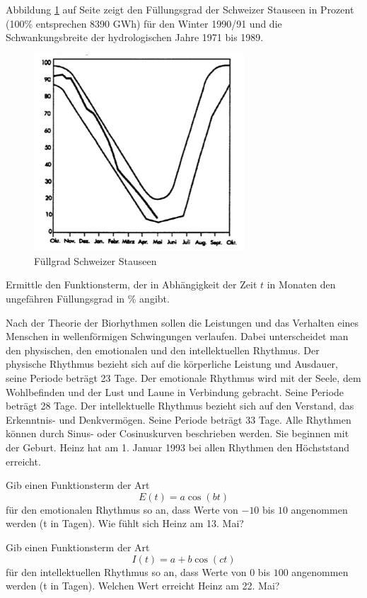 \documentclass[%
11pt,%
twoside,%
titlepage,%
german,%
headsepline%
]{scrartcl}
\begin{document}
\begin{ueb}[Stausee]
Abbildung \ref{abb:stausee} auf Seite \pageref{abb:stausee} zeigt den Füllungsgrad der Schweizer Stauseen in Prozent (100\% entsprechen 8390 GWh) für den Winter 1990/91 und die Schwankungsbreite der hydrologischen Jahre 1971 bis 1989.

\begin{figure}
\begin{center}
\includegraphics[width=0.7\textwidth]{pictures/stausee}
\end{center}
\caption{Füllgrad Schweizer Stauseen}\label{abb:stausee}
\end{figure}
Ermittle den Funktionsterm, der in Abhängigkeit der Zeit $t$ in Monaten den ungefähren Füllungsgrad in \% angibt.
\end{ueb}

\begin{ueb}[Biorhythmus]
Nach der Theorie der Biorhythmen sollen die Leistungen und das Verhalten eines Menschen in wellenförmigen Schwingungen verlaufen. Dabei unterscheidet man den physischen, den emotionalen und den intellektuellen Rhythmus. Der physische Rhythmus bezieht sich auf die körperliche Leistung und Ausdauer, seine Periode beträgt 23 Tage. Der emotionale Rhythmus wird mit der Seele, dem Wohlbefinden und der Lust und Laune in Verbindung gebracht. Seine Periode beträgt 28 Tage. Der intellektuelle Rhythmus bezieht sich auf den Verstand, das Erkenntnis- und Denkvermögen. Seine Periode beträgt 33 Tage. Alle Rhythmen können durch Sinus- oder Cosinuskurven beschrieben werden. Sie beginnen mit der Geburt. Heinz hat am 1. Januar 1993 bei allen Rhythmen den Höchststand erreicht.
\begin{enumeratea}
\item Gib einen Funktionsterm der Art
$$E(t) = a \cos(bt)$$
für den emotionalen Rhythmus so an, dass Werte von $-10$ bis $10$ angenommen werden (t in Tagen). Wie fühlt sich Heinz am 13. Mai?
\item Gib einen Funktionsterm der Art
$$I(t) = a + b \cos (ct)$$
für den intellektuellen Rhythmus so an, dass Werte von $0$ bis $100$ angenommen werden (t in Tagen). Welchen Wert erreicht Heinz am 22. Mai?
\end{enumeratea}
\end{ueb}
\end{document}
